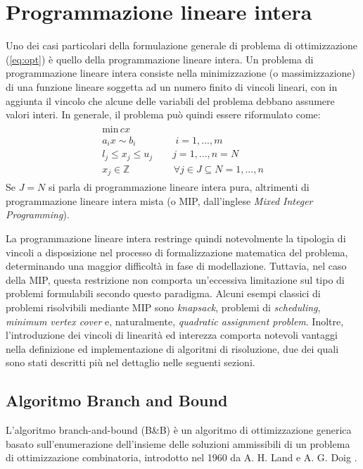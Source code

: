 \section{Programmazione lineare intera}
Uno dei casi particolari della formulazione generale di problema di ottimizzazione (\ref{eq:opt}) è quello della programmazione lineare intera.
Un problema di programmazione lineare intera consiste nella minimizzazione (o massimizzazione) di una funzione lineare soggetta ad un 
numero finito di vincoli lineari, con in aggiunta il vincolo che alcune delle variabili del problema debbano assumere valori interi. 
In generale, il problema può quindi essere riformulato come:
\begin{align*}
	\begin{array}{l}
      \text{min} \, cx\\
      a_i x \sim b_i \qquad\qquad i=1,...,m \\
      l_j \leq x_j \leq u_j \qquad j=1,...,n =N \\
      x_j \in \mathbb{Z}  \;\,\qquad\qquad \forall j \in J \subseteq N = {1,...,n}	
	\end{array}
\end{align*}
\indent
Se $J=N$ si parla di programmazione lineare intera pura, altrimenti di programmazione lineare intera mista (o MIP, dall'inglese 
\textit{Mixed Integer Programming}).

La programmazione lineare intera restringe quindi notevolmente la tipologia di vincoli a disposizione nel
processo di formalizzazione matematica del problema, determinando una maggior difficoltà in fase di modellazione.
Tuttavia, nel caso della MIP, questa restrizione non comporta un'eccessiva limitazione sul tipo di 
problemi formulabili secondo questo paradigma. Alcuni esempi classici di problemi risolvibili mediante MIP sono \textit{knapsack}, problemi di 
\textit{scheduling}, \textit{minimum vertex cover} e, naturalmente, \textit{quadratic assignment problem}.
Inoltre, l'introduzione dei vincoli di linearità ed interezza comporta notevoli vantaggi nella definizione ed
implementazione di algoritmi di risoluzione, due dei quali sono stati descritti più nel dettaglio nelle seguenti sezioni.

\subsection{Algoritmo Branch and Bound}
L'algoritmo branch-and-bound (B\&B) è un algoritmo di ottimizzazione generica basato sull'enumerazione dell'insieme delle soluzioni
ammissibili di un problema di ottimizzazione combinatoria, introdotto nel 1960 da A. H. Land e A. G. Doig \cite{10.2307/1910129}. 

